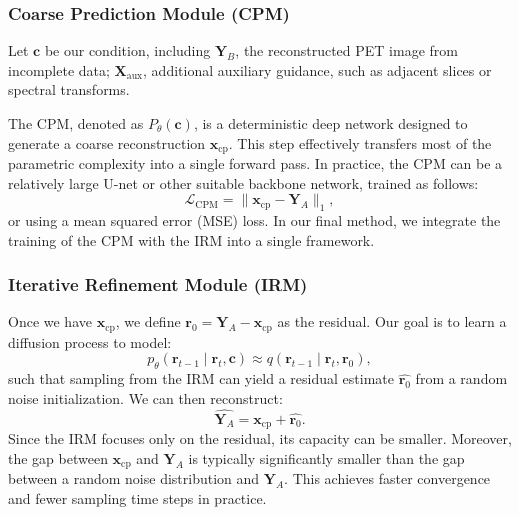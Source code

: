 \documentclass[
reprint,
superscriptaddress,
nofootinbib,
amsmath,amssymb,
aps,
prd,
]{revtex4-2}
\begin{document}
\subsubsection{Coarse Prediction Module (CPM)}
Let \(\mathbf{c}\) be our condition, including \(\mathbf{Y}_B\), the reconstructed PET image from incomplete data; \(\mathbf{X}_{\text{aux}}\), additional auxiliary guidance, such as adjacent slices or spectral transforms.



The CPM, denoted as \(P_\theta(\mathbf{c})\), is a deterministic deep network designed to generate a coarse reconstruction \(\mathbf{x}_\text{cp}\). This step effectively transfers most of the parametric complexity into a single forward pass. In practice, the CPM can be a relatively large U-net or other suitable backbone network, trained as follows:
\begin{equation}
\mathcal{L}_{\text{CPM}} = \|\mathbf{x}_\text{cp} - \mathbf{Y}_A\|_1,
\end{equation}
or using a mean squared error (MSE) loss. In our final method, we integrate the training of the CPM with the IRM into a single framework.

\subsubsection{Iterative Refinement Module (IRM)}
Once we have \(\mathbf{x}_\text{cp}\), we define \(\mathbf{r}_0 = \mathbf{Y}_A - \mathbf{x}_\text{cp}\) as the residual. Our goal is to learn a diffusion process to model:
\begin{equation}
p_\theta(\mathbf{r}_{t-1} \mid \mathbf{r}_t, \mathbf{c}) \approx q(\mathbf{r}_{t-1} \mid \mathbf{r}_t, \mathbf{r}_0),
\end{equation}
such that sampling from the IRM can yield a residual estimate \(\widehat{\mathbf{r}_0}\) from a random noise initialization. We can then reconstruct:
\begin{equation}
\widehat{\mathbf{Y}_A} = \mathbf{x}_\text{cp} + \widehat{\mathbf{r}_0}.
\end{equation}
Since the IRM focuses only on the residual, its capacity can be smaller. Moreover, the gap between \(\mathbf{x}_\text{cp}\) and \(\mathbf{Y}_A\) is typically significantly smaller than the gap between a random noise distribution and \(\mathbf{Y}_A\). This achieves faster convergence and fewer sampling time steps in practice.
\end{document}
